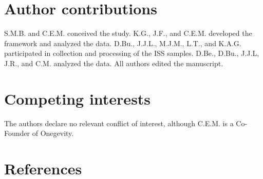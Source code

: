 \documentclass{article}
\begin{document}
\section*{Author contributions} 
S.M.B. and C.E.M. conceived the study.
K.G., J.F., and C.E.M. developed the framework and analyzed the data.
D.Bu., J.J.L., M.J.M., L.T., and K.A.G. participated in collection and processing of the ISS samples.
D.Be., D.Bu., J.J.L, J.R., and C.M. analyzed the data.
All authors edited the manuscript.

\section*{Competing interests} 
The authors declare no relevant conflict of interest, although C.E.M. is a Co-Founder of Onegevity.

\section*{References} 
\begingroup \raggedright \singlespacing \printbibliography[heading=none] \endgroup
\end{document}
